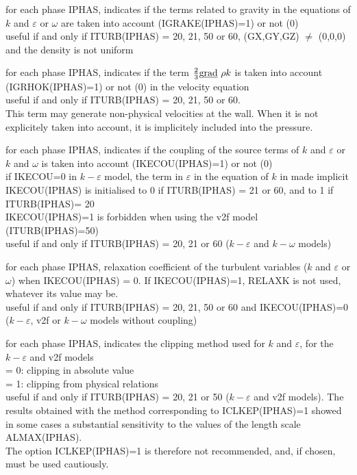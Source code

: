 {for each phase IPHAS, indicates if the terms related to gravity in the
equations of $k$ and $\varepsilon$ or $\omega$ are taken into account
(IGRAKE(IPHAS)=1) or not (0)\\
useful if and only if ITURB(IPHAS) = 20, 21, 50 or 60, (GX,GY,GZ)
$\ne$ (0,0,0) and the density is not uniform}

{for each phase IPHAS, indicates if the term $\frac{2}{3}\text{g}\underline{\text{rad}}\  \rho k$
is taken into account\\ (IGRHOK(IPHAS)=1) or not (0) in the velocity
equation\\
useful if and only if ITURB(IPHAS) = 20, 21, 50 or 60.\\
This term may generate
non-physical velocities at the wall. When it is not explicitely taken into
account, it is implicitely included into the pressure.}

{for each phase IPHAS, indicates if the coupling of the source terms of
$k$ and $\varepsilon$ or $k$ and $\omega$ is taken into account
(IKECOU(IPHAS)=1) or not (0)\\
if IKECOU=0 in $k-\varepsilon$ model, the term in $\varepsilon$ in the
equation of $k$ in made implicit\\
IKECOU(IPHAS) is initialised to 0 if ITURB(IPHAS) = 21 or 60, and to 1 if\\
ITURB(IPHAS)= 20\\
IKECOU(IPHAS)=1 is forbidden when using the v2f model
(ITURB(IPHAS)=50)\\
useful if and only if ITURB(IPHAS) = 20, 21 or 60 ($k-\varepsilon$ and
$k-\omega$ models)}

{for each phase IPHAS, relaxation coefficient of the turbulent
variables ($k$ and $\varepsilon$ or $\omega$) when IKECOU(IPHAS) = 0. If
IKECOU(IPHAS)=1, RELAXK is not used, whatever its value may be.\\
useful if and only if ITURB(IPHAS) = 20, 21, 50 or 60 and IKECOU(IPHAS)=0
($k-\varepsilon$, v2f or $k-\omega$ models without coupling)}

{for each phase IPHAS, indicates the clipping method used for $k$ and
$\varepsilon$, for the $k-\varepsilon$ and v2f models\\
\hspace*{1.3cm}= 0: clipping in absolute value\\
\hspace*{1.3cm}= 1: clipping from physical relations\\
useful if and only if ITURB(IPHAS) = 20, 21 or 50 ($k-\varepsilon$ and
v2f models). The results obtained with the method corresponding to
ICLKEP(IPHAS)=1 showed in some cases a substantial sensitivity to the
values of the length scale ALMAX(IPHAS).\\
The option ICLKEP(IPHAS)=1 is therefore not recommended, and,
if chosen, must be used cautiously.}

